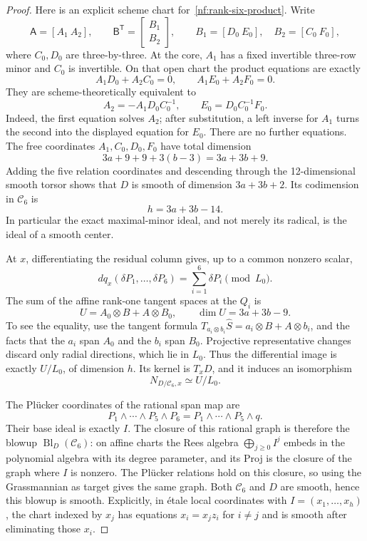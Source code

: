 \begin{proof}
Here is an explicit scheme chart for~\eqref{nf:rank-six-product}.
Write
\[
 \mathsf A=[A_1\ A_2],\qquad
 \mathsf B^{\mathsf T}=\begin{bmatrix}B_1\\B_2\end{bmatrix},
 \qquad B_1=[D_0\ E_0],\quad B_2=[C_0\ F_0],
\]
where $C_0,D_0$ are three-by-three. At the core, $A_1$ has a
fixed invertible three-row minor and $C_0$ is invertible. On that
open chart the product equations are exactly
\[
 A_1D_0+A_2C_0=0,\qquad A_1E_0+A_2F_0=0.
\]
They are scheme-theoretically equivalent to
\begin{equation}\label{nf:rank-six-solved-chart}
 A_2=-A_1D_0C_0^{-1},\qquad
 E_0=D_0C_0^{-1}F_0.
\end{equation}
Indeed, the first equation solves $A_2$; after substitution, a left
inverse for $A_1$ turns the second into the displayed equation for
$E_0$. There are no further equations. The free coordinates
$A_1,C_0,D_0,F_0$ have total dimension
\[
 3a+9+9+3(b-3)=3a+3b+9.
\]
Adding the five relation coordinates and descending through the
12-dimensional smooth torsor shows that $D$ is smooth of dimension
$3a+3b+2$. Its codimension in $\mathcal C_6$ is
\begin{equation}\label{nf:rank-six-center-codimension}
 h=3a+3b-14.
\end{equation}
In particular the exact maximal-minor ideal, and not merely its
radical, is the ideal of a smooth center.

At $x$, differentiating the residual column gives, up to a common
nonzero scalar,
\[
 dq_x(\delta P_1,\ldots,\delta P_6)
       =\sum_{i=1}^6\delta P_i\pmod{L_0}.
\]
The sum of the affine rank-one tangent spaces at the $Q_i$ is
\[
 U=A_0\otimes B+A\otimes B_0,
 \qquad \dim U=3a+3b-9.
\]
To see the equality, use the tangent formula
$T_{a_i\otimes b_i}\widehat S=a_i\otimes B+A\otimes b_i$,
and the facts that the $a_i$ span $A_0$ and the $b_i$ span $B_0$.
Projective representative changes discard only radial directions,
which lie in $L_0$. Thus the differential image is exactly $U/L_0$,
of dimension $h$. Its kernel is $T_xD$, and it induces an isomorphism
\begin{equation}\label{nf:rank-six-normal-map}
 N_{D/\mathcal C_6,x}\simeq U/L_0.
\end{equation}

The Pl\"ucker coordinates of the rational span map are
\[
 P_1\wedge\cdots\wedge P_5\wedge P_6
       =P_1\wedge\cdots\wedge P_5\wedge q.
\]
Their base ideal is exactly $I$. The closure of this rational graph
is therefore the blowup $\operatorname{Bl}_D(\mathcal C_6)$:
on affine charts the Rees algebra $\bigoplus_{j\geq0}I^j$ embeds
in the polynomial algebra with its degree parameter, and its Proj
is the closure of the graph where $I$ is nonzero. The Pl\"ucker
relations hold on this closure, so using the Grassmannian as target
gives the same graph. Both $\mathcal C_6$ and $D$ are smooth, hence
this blowup is smooth. Explicitly, in \'etale local coordinates with
$I=(x_1,\ldots,x_h)$, the chart indexed by $x_j$ has equations
$x_i=x_jz_i$ for $i\ne j$ and is smooth after eliminating those
$x_i$.


\end{proof}
